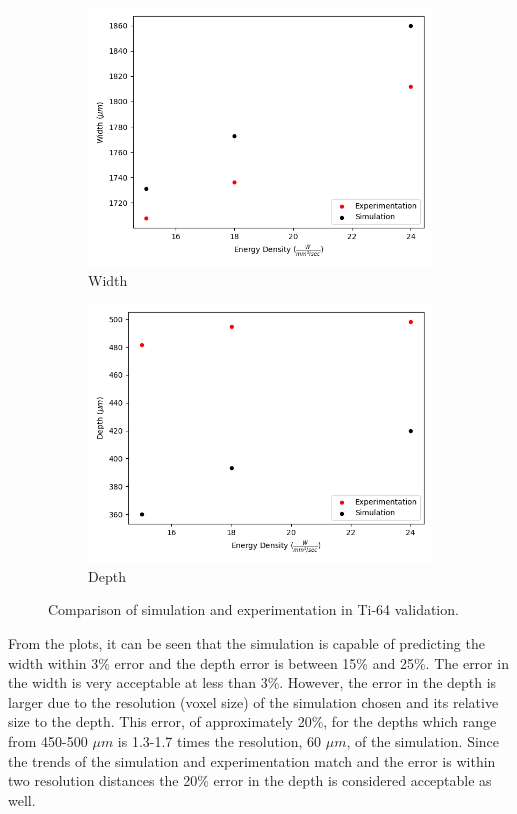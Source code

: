 \documentclass[pdflatex,sn-mathphys]{sn-jnl}
\begin{document}
	\begin{figure}[!htb]\centering
		\begin{subfigure}[c]{0.45\textwidth}\centering
		\includegraphics[width=\textwidth]{ti64_melt_track_width}
		\caption{Width}
		\label{fig:ti64_melt_track_width}
		\end{subfigure}\hfill{}
			\begin{subfigure}[c]{0.45\textwidth}\centering
			\includegraphics[width=\textwidth]{ti64_melt_track_depth}
			\caption{Depth}
			\label{fig:ti64_melt_track_depth}
			\end{subfigure}
		\caption{Comparison of simulation and experimentation in Ti-64 validation.}
		\label{fig:ti64_melt_track}
	\end{figure}
	From the plots, it can be seen that the simulation is capable of predicting the width within 3\% error and the depth error is between 15\% and 25\%.  The error in the width is very acceptable at less than 3\%.
	However, the error in the depth is larger due to the resolution (voxel size) of the simulation chosen and its relative size to the depth.  This error, of approximately 20\%, for the depths which range from 450-500 $\mu m$ is 1.3-1.7 times the resolution, 60 $\mu m$, of the simulation.  Since the trends of the simulation and experimentation match and the error is within two resolution distances the 20\% error in the depth is considered acceptable as well. 	
\end{document}
